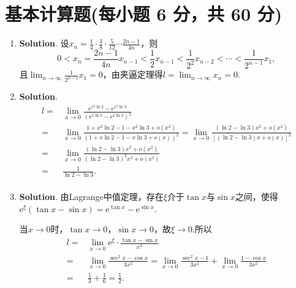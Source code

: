 \documentclass[../main.tex]{subfiles}
\begin{document}
\section{基本计算题(每小题 6 分，共 60 分)}
\begin{enumerate}
    \item \textbf{Solution}. 设$x_{n}=\frac{1}{4}\cdot\frac{3}{8}\cdot\frac{5}{12}
              \cdots\frac{2n-1}{4n}$，则
          \[
              0<x_{n}=\frac{2n-1}{4n}x_{n-1}<\frac{1}{2}x_{n-1}<\frac{1}{2^{2}}x_{n-2}<
              \cdots<\frac{1}{2^{n-1}}x_{1},
          \]
          且$\lim_{n\to\infty}\frac{1}{2^{n-1}}x_{1}=0$，由夹逼定理得$l=\lim_{n\to\infty}
              x_{n}=0$.

    \item \textbf{Solution}.
          \[
              \begin{aligned}
                  l = {} & \lim_{x\to 0}\frac{\mathrm{e}^{x^2\ln 2}-\mathrm{e}^{x^2\ln 3}}{\left(\mathrm{e}^{x\ln 2}-\mathrm{e}^{x\ln 3}\right)^2}                                                   \\
                  = {}   & \lim_{x\to0}\frac{1+x^2\ln 2-1-x^2\ln 3+o(x^2)}{\left(1+x\ln 2-1-x\ln 3+o(x)\right)^2}=\lim_{x\to0}\frac{(\ln 2 - \ln 3)x^2+o(x^2)}{\left[(\ln 2 - \ln 3)x+o(x)\right]^2} \\
                  = {}   & \lim_{x\to0}\frac{(\ln 2-\ln 3)x^2+o(x^2)}{(\ln 2-\ln 3)^2x^2+o(x^2)}                                                                                                     \\
                  = {}   & \frac{1}{\ln 2-\ln 3}.                                                                                                                                                    \\
              \end{aligned}
          \]

    \item \textbf{Solution}. 由Lagrange中值定理，存在$\xi$介于$\tan x$与$\sin x$之间，使得$\mathrm{e}
              ^{\xi}(\tan x-\sin x)=\mathrm{e}^{\tan x}-\mathrm{e}^{\sin x}$.

          当$x\to0$时，$\tan x\to0$，$\sin x\to0$，故$\xi\to0$.所以
          \[
              \begin{aligned}
                  l= {} & \lim_{x\to0}\mathrm{e}^{\xi}\cdot\frac{\tan x-\sin x}{x^3}                                                      \\
                  = {}  & \lim_{x\to0}\frac{\sec^2 x-\cos x}{3x^2}=\lim_{x\to0}\frac{\sec^2 x- 1}{3x^2}+\lim_{x\to0}\frac{1-\cos x}{3x^2} \\
                  = {}  & \frac{1}{3}+\frac{1}{6}=\frac{1}{2}.
              \end{aligned}
          \]


\end{enumerate}
\end{document}
